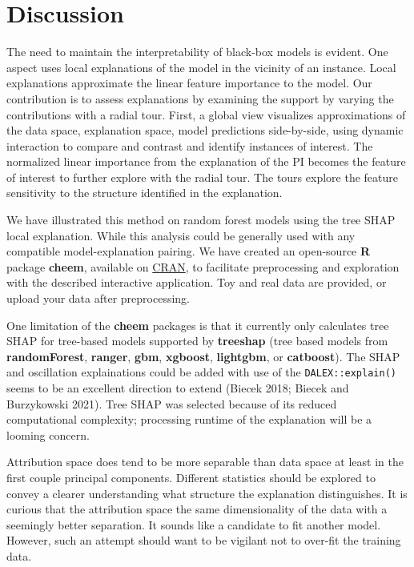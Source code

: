 \documentclass[
]{article}
\begin{document}
\hypertarget{sec:cheemdiscussion}{%
\section{Discussion}\label{sec:cheemdiscussion}}

\begin{quote}
\end{quote}

The need to maintain the interpretability of black-box models is evident. One aspect uses local explanations of the model in the vicinity of an instance. Local explanations approximate the linear feature importance to the model. Our contribution is to assess explanations by examining the support by varying the contributions with a radial tour. First, a global view visualizes approximations of the data space, explanation space, model predictions side-by-side, using dynamic interaction to compare and contrast and identify instances of interest. The normalized linear importance from the explanation of the PI becomes the feature of interest to further explore with the radial tour. The tours explore the feature sensitivity to the structure identified in the explanation.

We have illustrated this method on random forest models using the tree SHAP local explanation. While this analysis could be generally used with any compatible model-explanation pairing. We have created an open-source \textbf{R} package \textbf{cheem}, available on \href{https://CRAN.R-project.org/package=cheem}{CRAN}, to facilitate preprocessing and exploration with the described interactive application. Toy and real data are provided, or upload your data after preprocessing.

One limitation of the \textbf{cheem} packages is that it currently only calculates tree SHAP for tree-based models supported by \textbf{treeshap} (tree based models from \textbf{randomForest}, \textbf{ranger}, \textbf{gbm}, \textbf{xgboost}, \textbf{lightgbm}, or \textbf{catboost}). The SHAP and oscillation explainations could be added with use of the \texttt{DALEX::explain()} seems to be an excellent direction to extend (Biecek 2018; Biecek and Burzykowski 2021). Tree SHAP was selected because of its reduced computational complexity; processing runtime of the explanation will be a looming concern.

Attribution space does tend to be more separable than data space at least in the first couple principal components. Different statistics should be explored to convey a clearer understanding what structure the explanation distinguishes. It is curious that the attribution space the same dimensionality of the data with a seemingly better separation. It sounds like a candidate to fit another model. However, such an attempt should want to be vigilant not to over-fit the training data.
\end{document}
